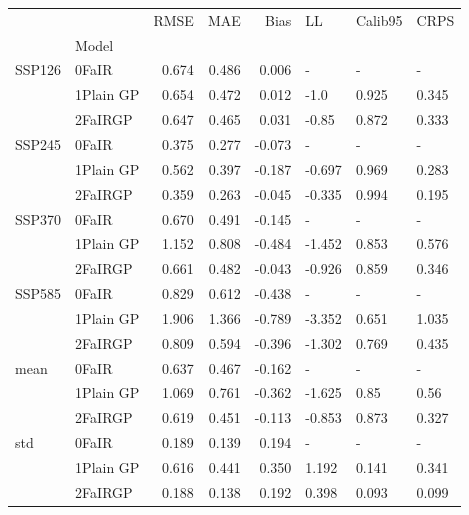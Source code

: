 \begin{tabular}{llrrrlll}
\toprule
    &         &   RMSE &    MAE &   Bias &     LL & Calib95 &   CRPS \\
{} & Model &        &        &        &        &         &        \\
\midrule
SSP126 & 0FaIR &  0.674 &  0.486 &  0.006 &      - &       - &      - \\
    & 1Plain GP &  0.654 &  0.472 &  0.012 &   -1.0 &   0.925 &  0.345 \\
    & 2FaIRGP &  0.647 &  0.465 &  0.031 &  -0.85 &   0.872 &  0.333 \\
SSP245 & 0FaIR &  0.375 &  0.277 & -0.073 &      - &       - &      - \\
    & 1Plain GP &  0.562 &  0.397 & -0.187 & -0.697 &   0.969 &  0.283 \\
    & 2FaIRGP &  0.359 &  0.263 & -0.045 & -0.335 &   0.994 &  0.195 \\
SSP370 & 0FaIR &  0.670 &  0.491 & -0.145 &      - &       - &      - \\
    & 1Plain GP &  1.152 &  0.808 & -0.484 & -1.452 &   0.853 &  0.576 \\
    & 2FaIRGP &  0.661 &  0.482 & -0.043 & -0.926 &   0.859 &  0.346 \\
SSP585 & 0FaIR &  0.829 &  0.612 & -0.438 &      - &       - &      - \\
    & 1Plain GP &  1.906 &  1.366 & -0.789 & -3.352 &   0.651 &  1.035 \\
    & 2FaIRGP &  0.809 &  0.594 & -0.396 & -1.302 &   0.769 &  0.435 \\
mean & 0FaIR &  0.637 &  0.467 & -0.162 &      - &       - &      - \\
    & 1Plain GP &  1.069 &  0.761 & -0.362 & -1.625 &    0.85 &   0.56 \\
    & 2FaIRGP &  0.619 &  0.451 & -0.113 & -0.853 &   0.873 &  0.327 \\
std & 0FaIR &  0.189 &  0.139 &  0.194 &      - &       - &      - \\
    & 1Plain GP &  0.616 &  0.441 &  0.350 &  1.192 &   0.141 &  0.341 \\
    & 2FaIRGP &  0.188 &  0.138 &  0.192 &  0.398 &   0.093 &  0.099 \\
\bottomrule
\end{tabular}
